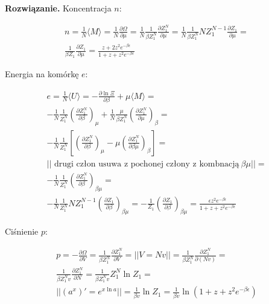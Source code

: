\documentclass[11pt,a4paper]{article}
\newenvironment{solution}{\vspace{1cm} \par\textbf{Rozwiązanie.} \vspace{1cm}}{}
\begin{document}
\begin{solution}
Koncentracja $n$:

\begin{align*}
  n = \frac{1}{N} \langle M \rangle = 
   \frac{1}{N} \frac{\partial \Omega}{\partial \mu} =
    \frac{1}{N} \frac{1}{\beta Z_{1}^{N}}\frac{\partial Z_{1}^{N}}{\partial \mu} = 
    \frac{1}{N} \frac{1}{\beta Z_{1}^{N}} N Z_{1}^{N-1} \frac{\partial Z_{1}}{\partial \mu} = \\
    \frac{1}{\beta Z_{1}} \frac{\partial Z_{1}}{\partial \mu} =
    \frac{z + 2 z^2 e^{-\beta \epsilon}}{1 + z + z^2 e^{-\beta \epsilon}}
\end{align*}

Energia na komórkę $e$:

\begin{align*}
  e = \frac{1}{N} \langle U \rangle =  
  -\frac{\partial \ln \Xi}{\partial \beta} + \mu \langle M \rangle = \\
  -\frac{1}{N} \frac{1}{Z_{1}^{N}}  \left (\frac{\partial Z_{1}^{N}}{\partial \beta} \right)_{\mu} +
  \frac{1}{N} \frac{\mu}{\beta Z_{1}^{N}} \left( \frac{\partial Z_{1}^{N}}{\partial \mu} \right)_{\beta} = \\
  -\frac{1}{N} \frac{1}{Z_{1}^{N}} 
  \left[ \left( \frac{\partial Z_{1}^{N}}{\partial \beta} \right)_{\mu} -
    \mu \left( \frac{\partial Z_{1}^{N}}{\partial \beta \mu} \right)_{\beta} \right] =\\
    || \text{ drugi człon usuwa z pochonej człony z kombnacją}~ \beta \mu || = \\
    -\frac{1}{N} \frac{1}{Z_{1}^{N}} \left( \frac{\partial Z_{1}^{N}}{\partial \beta} \right)_{\beta\mu} = \\
    -\frac{1}{N} \frac{1}{Z_{1}^{N}} N Z_{1}^{N-1} \left( \frac{\partial Z_{1}}{\partial \beta} \right)_{\beta\mu} =
    -\frac{1}{Z_{1}} \left( \frac{\partial Z_{1}}{\partial \beta} \right)_{\beta\mu} = 
    \frac{\epsilon z^2 e^{-\beta \epsilon}}{1 + z + z^2 e^{-\beta \epsilon}}
\end{align*}

Ciśnienie $p$:

\begin{align*}
    p = - \frac{\partial \Omega}{\partial V} =
     \frac{1}{\beta Z_{1}^{N}}\frac{\partial Z_{1}^{N}}{\partial V} =
     || V = N v || =
     \frac{1}{\beta Z_{1}^{N}}\frac{\partial Z_{1}^{N}}{\partial (Nv)} = \\
     \frac{1}{\beta Z_{1}^{N}v}\frac{\partial Z_{1}^{N}}{\partial N} = 
      \frac{1}{\beta Z_{1}^{N}v} Z_{1}^{N} \ln Z_{1} = \\
      || (a^{x})' = e^{x \ln a} || =
      \frac{1}{\beta v} \ln Z_{1} =
      \frac{1}{\beta v} \ln (1 + z + z^2 e^{-\beta \epsilon}) 
\end{align*}
  

\end{solution}
\end{document}
